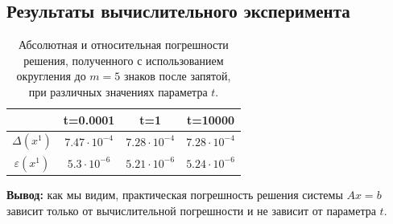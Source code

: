 \documentclass[12pt]{article}%
\begin{document}
\subsection{Результаты вычислительного эксперимента}
\begin{table}[h]
    \centering
    \begin{tabular}{|c|c|c|c|}
    \hline             & t=0.0001 & t=1 & t=10000  \\
    \hline $\Delta(x^1)$       & $7.47 \cdot 10^{-4}$ 
                               & $7.28 \cdot 10^{-4}$ 
                               & $7.28 \cdot 10^{-4}$ \\
    \hline $\varepsilon(x^1)$  & $5.3 \cdot 10^{-6}$  
                               & $5.21 \cdot 10^{-6}$
                               & $5.24 \cdot 10^{-6}$ \\
    \hline
    \end{tabular}
    \caption{Абсолютная и относительная погрешности решения, полученного с использованием округления до $m=5$ знаков после запятой, при различных значениях параметра $t$.}
    \label{tab:my_label}
\end{table}

\textbf{Вывод:} как мы видим, практическая погрешность решения системы $Ax=b$ зависит только от вычислительной погрешности и не зависит от параметра $t$.
\end{document}

